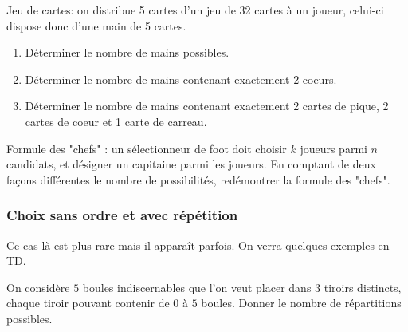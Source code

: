 \documentclass[a4paper, 11pt]{article}
\begin{document}
{\footnotesize\begin{exercice}
Jeu de cartes: on distribue 5 cartes d'un jeu de 32 cartes \`a un joueur, celui-ci dispose donc d'une main de 5 cartes.
\begin{enumerate}
\item D\'eterminer le nombre de mains possibles.
\item D\'eterminer le nombre de mains contenant exactement 2 coeurs.
\item D\'eterminer le nombre de mains contenant exactement 2 cartes de pique, 2 cartes de coeur et 1 carte de carreau.
\end{enumerate}
\end{exercice}}

{\footnotesize\begin{exercice}
Formule des "chefs" : un s\'electionneur de foot doit choisir $k$ joueurs parmi $n$ candidats, et d\'esigner un capitaine parmi les joueurs. En comptant de deux fa\c cons diff\'erentes le nombre de possibilit\'es, red\'emontrer la formule des "chefs".
\end{exercice}}


\vspace*{0.2cm}



\subsubsection{Choix sans ordre et avec r\'ep\'etition}

\noindent Ce cas l\`{a} est plus rare mais il appara\^{i}t parfois. On verra quelques exemples en TD.

\begin{exemple}  On consid\`ere $5$ boules indiscernables que l'on veut placer dans $3$ tiroirs distincts, chaque tiroir pouvant contenir de 0 \`a $5$ boules. Donner le nombre de r\'epartitions possibles.\\
\vspace*{5cm}
\end{exemple}
\end{document}
